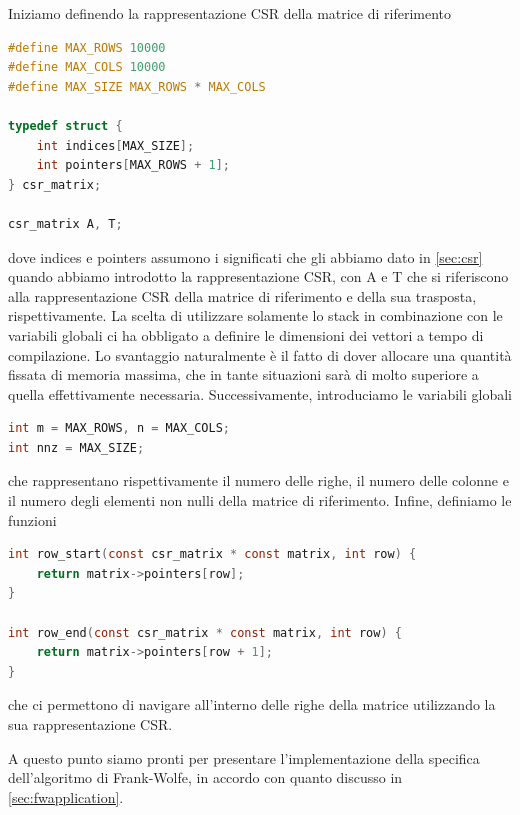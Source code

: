 Iniziamo definendo la rappresentazione CSR della matrice di riferimento
\begin{inline}
\begin{lstlisting}[style = style2, language=c]
#define MAX_ROWS 10000
#define MAX_COLS 10000
#define MAX_SIZE MAX_ROWS * MAX_COLS

typedef struct {
    int indices[MAX_SIZE];
    int pointers[MAX_ROWS + 1];
} csr_matrix;

csr_matrix A, T;
\end{lstlisting}
\end{inline}
\noindent
dove {\jbm indices} e {\jbm pointers} assumono i significati che gli abbiamo dato in \ref{sec:csr} quando abbiamo
introdotto la rappresentazione CSR, con {\jbm A} e {\jbm T} che si riferiscono alla rappresentazione CSR della matrice
di riferimento e della sua trasposta, rispettivamente. La scelta di utilizzare solamente lo stack in combinazione con le
variabili globali ci ha obbligato a definire le dimensioni dei vettori a tempo di compilazione. Lo svantaggio naturalmente è
il fatto di dover allocare una quantità fissata di memoria massima, che in tante situazioni sarà di molto superiore a
quella effettivamente necessaria.
Successivamente, introduciamo le variabili globali
\begin{inline}
\begin{lstlisting}[style = style2, language=c]
int m = MAX_ROWS, n = MAX_COLS;
int nnz = MAX_SIZE;
\end{lstlisting}
\end{inline}
\noindent
che rappresentano rispettivamente il numero delle righe, il numero delle colonne e il numero degli elementi non nulli
della matrice di riferimento.
Infine, definiamo le funzioni
\begin{inline}
\begin{lstlisting}[style = style2, language=c]
int row_start(const csr_matrix * const matrix, int row) {
    return matrix->pointers[row];
}

int row_end(const csr_matrix * const matrix, int row) {
    return matrix->pointers[row + 1];
}
\end{lstlisting}
\end{inline}
\noindent
che ci permettono di navigare all'interno delle righe della matrice utilizzando la sua rappresentazione CSR.

A questo punto siamo pronti per presentare l'implementazione della specifica dell'algoritmo di Frank-Wolfe, in accordo
con quanto discusso in \ref{sec:fwapplication}.

